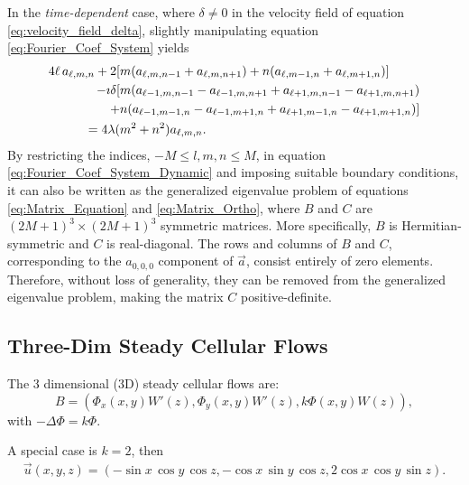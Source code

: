 \documentclass[11pt]{amsart}
\begin{document}
In the \emph{time-dependent} case, where $\delta\neq0$ in the velocity field
of equation \eqref{eq:velocity_field_delta}, slightly manipulating equation
\eqref{eq:Fourier_Coef_System} yields 
%
\begin{align}\label{eq:Fourier_Coef_System_Dynamic}
4\ell\,a_{\ell,m,n}
+2[&m(a_{\ell,m,n-1}+a_{\ell,m,n+1})+n(a_{\ell,m-1,n}+a_{\ell,m+1,n})]
\notag\\
-\imath\delta[&m(a_{\ell-1,m,n-1}-a_{\ell-1,m,n+1}+a_{\ell+1,m,n-1}-a_{\ell+1,m,n+1})\notag\\
    +&n(a_{\ell-1,m-1,n}-a_{\ell-1,m+1,n}+a_{\ell+1,m-1,n}-a_{\ell+1,m+1,n})] 
\notag\\
=4\lambda(&m^2+n^2)a_{\ell,m,n}.
\end{align}
%
By restricting the indices, $-M\leq l,m,n\leq M$, in equation
\eqref{eq:Fourier_Coef_System_Dynamic} and imposing suitable boundary 
conditions, it can also be
written as the generalized eigenvalue problem of equations
\eqref{eq:Matrix_Equation} and \eqref{eq:Matrix_Ortho}, where  $B$ and
$C$ are $(2M+1)^3\times(2M+1)^3$ symmetric matrices. More specifically,
$B$ is Hermitian-symmetric and $C$ is real-diagonal. The rows and
columns of $B$ and $C$, corresponding to the $a_{0,0,0}$ component of
$\vec{a}$, consist entirely of zero elements. Therefore, without loss
of generality, they can be removed from the generalized eigenvalue
problem, making the matrix $C$ positive-definite.  






\subsection{Three-Dim Steady Cellular Flows}
The 3 dimensional (3D) steady cellular flows are:
%
\begin{equation}
B =
(\Phi_x(x,y)W'(z),\Phi_y(x,y)W'(z),k\Phi(x,y)W(z)), \label{3dcell}
\end{equation}
with $-\Delta \Phi = k \Phi.$   
\medskip

A special case is $k=2$, then
%
\begin{align}\label{3dcell-1}
  \vec{u}(x,y,z) =
  (-\sin{x}\,\cos{y}\,\cos{z},-\cos{x}\,\sin{y}\,\cos{z},2\cos{x}\,\cos{y}\,\sin{z}).  
\end{align}

\medskip

\end{document}
